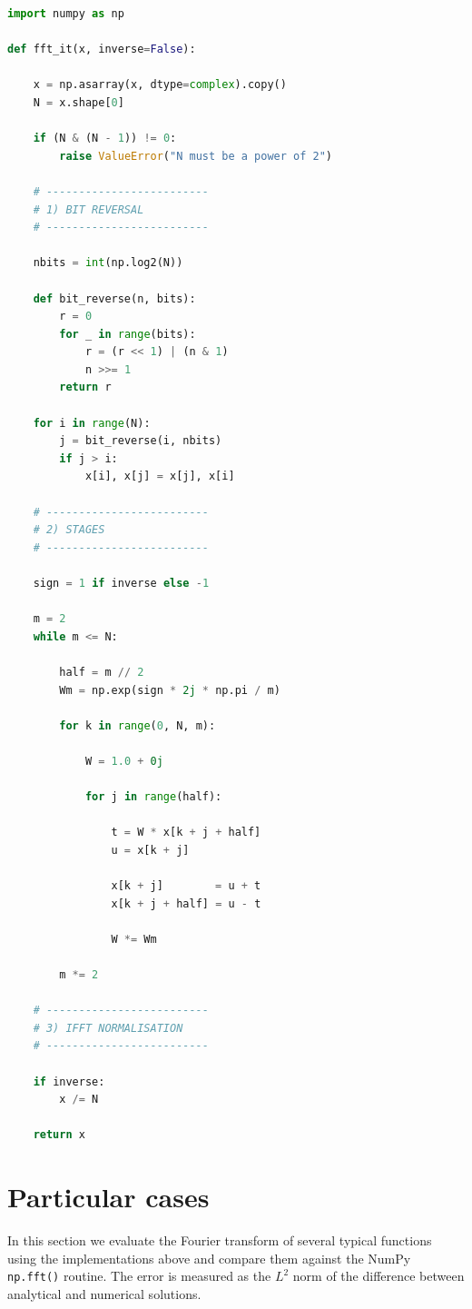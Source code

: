 \documentclass[11pt,a4paper,twoside,pdf]{article}
\numberwithin{equation}{section}
\begin{document}
\begin{lstlisting}[language=Python, caption = Iterative FFT implementation.]
import numpy as np

def fft_it(x, inverse=False):

    x = np.asarray(x, dtype=complex).copy()
    N = x.shape[0]

    if (N & (N - 1)) != 0:
        raise ValueError("N must be a power of 2")

    # -------------------------
    # 1) BIT REVERSAL
    # -------------------------

    nbits = int(np.log2(N))

    def bit_reverse(n, bits):
        r = 0
        for _ in range(bits):
            r = (r << 1) | (n & 1)
            n >>= 1
        return r

    for i in range(N):
        j = bit_reverse(i, nbits)
        if j > i:
            x[i], x[j] = x[j], x[i]

    # -------------------------
    # 2) STAGES
    # -------------------------

    sign = 1 if inverse else -1

    m = 2
    while m <= N:

        half = m // 2
        Wm = np.exp(sign * 2j * np.pi / m)

        for k in range(0, N, m):

            W = 1.0 + 0j

            for j in range(half):

                t = W * x[k + j + half]
                u = x[k + j]

                x[k + j]        = u + t
                x[k + j + half] = u - t

                W *= Wm

        m *= 2

    # -------------------------
    # 3) IFFT NORMALISATION
    # -------------------------

    if inverse:
        x /= N

    return x
\end{lstlisting}




\section{Particular cases}


In this section we evaluate the Fourier transform of several typical functions using the implementations above and compare them against the NumPy \texttt{np.fft()} routine. The error is measured as the $L^2$ norm of the difference between analytical and numerical solutions.
\end{document}
